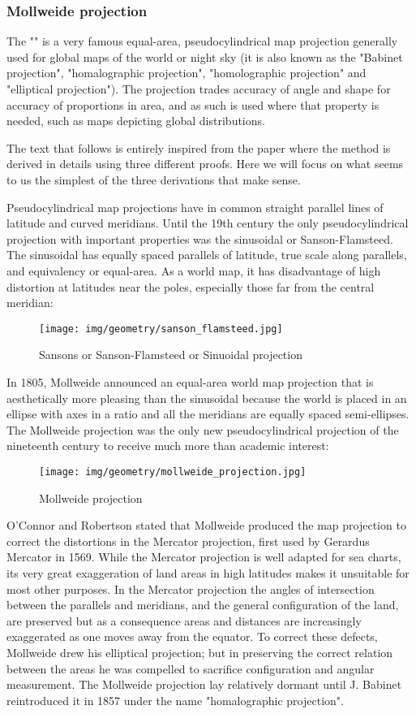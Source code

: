 	\subsubsection{Mollweide projection}
	The "\label{Mollweide projection}" is a very famous equal-area, pseudocylindrical map projection generally used for global maps of the world or night sky (it is also known as the "Babinet projection", "homalographic projection", "homolographic projection" and "elliptical projection"). The projection trades accuracy of angle and shape for accuracy of proportions in area, and as such is used where that property is needed, such as maps depicting global distributions. 
	
	The text that follows is entirely inspired from the paper \cite{lapaine2011mollweideova} where the method is derived in details using three different proofs. Here we will focus on what seems to us the simplest of the three derivations that make sense.
	
	Pseudocylindrical map projections have in common straight parallel lines of latitude and curved meridians. Until the 19th century the only pseudocylindrical projection with important properties was the sinusoidal or Sanson-Flamsteed. The sinusoidal has equally spaced parallels of latitude, true scale along parallels, and equivalency or equal-area. As a world map, it has disadvantage of high distortion at latitudes near the poles, especially those far from the central meridian:
	\begin{figure}[H]
		\centering
		\texttt{[image: img/geometry/sanson\_flamsteed.jpg]}
		\caption{Sansons or Sanson-Flamsteed or Sinuoidal projection}
	\end{figure} 
	In 1805, Mollweide announced an equal-area world map projection that is aesthetically more pleasing than the sinusoidal because the world is placed in an ellipse with axes in a ratio and all the meridians are equally spaced semi-ellipses. The Mollweide projection was the only new pseudocylindrical projection of the nineteenth century to receive much more than academic interest:
	\begin{figure}[H]
		\centering
		\texttt{[image: img/geometry/mollweide\_projection.jpg]}
		\caption{Mollweide projection}
	\end{figure} 
	O'Connor and Robertson stated that Mollweide produced the map projection to correct the distortions in the Mercator projection, first used by Gerardus Mercator
in 1569. While the Mercator projection is well adapted for sea charts, its very great exaggeration of land areas in high latitudes makes it unsuitable for most other purposes. In the Mercator projection the angles of intersection between
the parallels and meridians, and the general configuration of the land, are preserved but as a consequence areas and distances are increasingly exaggerated as one moves away from the equator. To correct these defects, Mollweide drew 
his elliptical projection; but in preserving the correct relation between the areas he was compelled to sacrifice configuration and angular measurement. The Mollweide projection lay relatively dormant until J. Babinet reintroduced it in 1857 under the name "homalographic projection".

